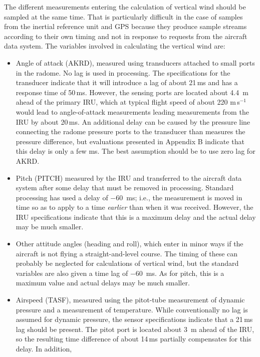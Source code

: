 \documentclass[12pt,twoside,english]{article}\usepackage[]{graphicx}\usepackage[]{color}
\let\OrgIndex\index
\renewcommand*{\index}[1]{\OrgIndex{#1}}
\begin{document}
{{
The different measurements entering the calculation of vertical wind should be sampled at the same time. That is particularly difficult in the case of samples from the inertial reference unit and GPS because they produce sample streams according to their own timing and not in response to requests from the aircraft data system. The variables involved in calculating the vertical wind are:  
\begin{itemize}
\item Angle of attack (AKRD), measured using transducers attached to small ports in the radome. No lag is used in processing. The specifications for the transducer indicate that it will introduce a lag of about 21\,ms and has a response time of 50\,ms. However, the sensing ports are located about 4.4~m ahead of the primary IRU, which at typical flight speed of about 220 m\,s$^{-1}$ would lead to angle-of-attack measurements leading measurements from the IRU by about 20\,ms. 
An additional delay can be caused by the pressure line connecting the radome pressure ports to the transducer than measures the pressure difference, but
evaluations presented in Appendix B indicate that this delay is only a few ms. The best assumption should be to use zero lag for AKRD.
\item Pitch (PITCH) measured by the IRU and transferred to the aircraft data system after some delay that must be removed in processing. Standard processing has used a delay of $-60$~ms; i.e., the measurement is moved in time so as to apply to a time \emph{earlier} than when it was received. However, the IRU specifications indicate that this is a maximum delay and the actual delay may be much smaller.
\item Other attitude angles (heading and roll), which enter in minor ways if the aircraft is not flying a straight-and-level course. The timing of these can probably be neglected for calculations of vertical wind, but the standard variables are also given a time lag of $-60$~ms. As for pitch, this is a maximum value and actual delays may be much smaller.
\item Airspeed (TASF), measured using the pitot-tube measurement of dynamic pressure and a measurement of temperature. While conventionally no lag is assumed for dynamic pressure, the sensor specifications indicate that a 21\,ms lag should be present. The pitot port is located about 3~m ahead of the IRU, so the resulting time difference of about 14\,ms partially compensates for this delay. In addition,

\end{itemize}}}
\end{document}
